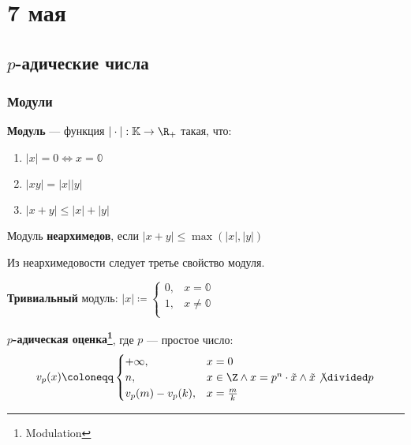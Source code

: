 \chapter{7 мая}

\section{\(p\)-адические числа}

\subsection{Модули}

\begin{definition}
	\textbf{Модуль} --- функция \(|\cdot| : \mathbb{K} \to \R_+\) такая, что:
	\begin{enumerate}
		\item \(|x| = 0 \iff x = \mathbb{0}\)
		\item \(|xy| = |x| |y|\)
		\item \(|x + y| \le |x| + |y|\)
	\end{enumerate}
\end{definition}

\begin{definition}
	Модуль \textbf{неархимедов}, если \(|x + y| \le \max(|x|, |y|)\)
\end{definition}
\begin{remark}
	Из неархимедовости следует третье свойство модуля.
\end{remark}

\begin{definition}
	\textbf{Тривиальный} модуль: \(|x| \coloneqq \begin{cases}
		0, & x = \mathbb{0}    \\
		1, & x \neq \mathbb{0} \\
	\end{cases}\)
\end{definition}

\begin{definition}
	\textbf{\(p\)-адическая оценка\footnote{Modulation}}, где \(p\) --- простое число:
	\[v_p(x) \coloneqq \begin{cases}
			+\infty,         & x = 0                                                                 \\
			n,               & x \in \Z \land x = p^n \cdot \tilde{x} \land \tilde{x} \not\divided p \\
			v_p(m) - v_p(k), & x = \frac{m}{k}
		\end{cases}\]
\end{definition}

